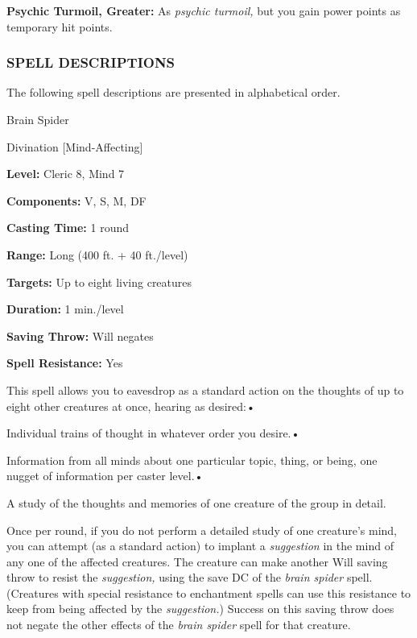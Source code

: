 \documentclass{article}
\begin{document}
\textbf{Psychic Turmoil, Greater:} As \textit{psychic turmoil, }but you gain power 
points as temporary hit points.

\vspace{12pt}
\subsubsection*{{\LARGE{}SPELL DESCRIPTIONS}}

The following spell descriptions are presented in alphabetical order.

\vspace{12pt}
Brain Spider

Divination [Mind-Affecting]

\textbf{Level: }Cleric 8, Mind 7

\textbf{Components:} V, S, M, DF

\textbf{Casting Time:} 1 round

\textbf{Range:} Long (400 ft. + 40 ft./level)

\textbf{Targets:} Up to eight living creatures

\textbf{Duration:} 1 min./level

\textbf{Saving Throw:} Will negates

\textbf{Spell Resistance:} Yes

This spell allows you to eavesdrop as a standard action on the thoughts of up to 
eight other creatures at once, hearing as desired:• 

\parindent=3pt
Individual trains of thought in whatever order you desire.• 

Information from all minds about one particular topic, thing, or being, one nugget 
of information per caster level.• 

\parindent=7pt
A study of the thoughts and memories of one creature of the group in detail.

\parindent=0pt
Once per round, if you do not perform a detailed study of one creature's mind, 
you can attempt (as a standard action) to implant a \textit{suggestion }in the 
mind of any one of the affected creatures. The creature can make another Will saving 
throw to resist the \textit{suggestion, }using the save DC of the \textit{brain 
spider }spell. (Creatures with special resistance to enchantment spells can use 
this resistance to keep from being affected by the \textit{suggestion.}) Success 
on this saving throw does not negate the other effects of the \textit{brain spider 
}spell for that creature.
\end{document}
